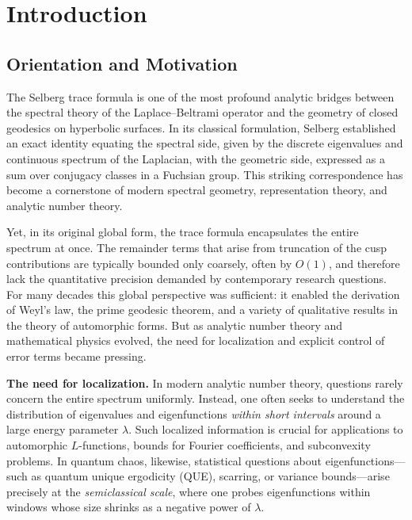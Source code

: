 
\section{Introduction}
\label{sec:introduction}

\subsection*{Orientation and Motivation}

The Selberg trace formula is one of the most profound analytic bridges between
the spectral theory of the Laplace–Beltrami operator and the geometry of closed
geodesics on hyperbolic surfaces. In its classical formulation, Selberg
\cite{Selberg1956} established an exact identity equating the spectral side,
given by the discrete eigenvalues and continuous spectrum of the Laplacian, with
the geometric side, expressed as a sum over conjugacy classes in a Fuchsian
group. This striking correspondence has become a cornerstone of modern spectral
geometry, representation theory, and analytic number theory.

Yet, in its original global form, the trace formula encapsulates the entire
spectrum at once. The remainder terms that arise from truncation of the cusp
contributions are typically bounded only coarsely, often by $O(1)$, and
therefore lack the quantitative precision demanded by contemporary research
questions. For many decades this global perspective was sufficient: it enabled
the derivation of Weyl’s law, the prime geodesic theorem, and a variety of
qualitative results in the theory of automorphic forms. But as analytic number
theory and mathematical physics evolved, the need for localization and explicit
control of error terms became pressing.

\medskip

\noindent\textbf{The need for localization.}
In modern analytic number theory, questions rarely concern the entire spectrum
uniformly. Instead, one often seeks to understand the distribution of
eigenvalues and eigenfunctions \emph{within short intervals} around a large
energy parameter $\lambda$. Such localized information is crucial for
applications to automorphic $L$-functions, bounds for Fourier coefficients, and
subconvexity problems. In quantum chaos, likewise, statistical questions about
eigenfunctions---such as quantum unique ergodicity (QUE), scarring, or
variance bounds---arise precisely at the \emph{semiclassical scale}, where one
probes eigenfunctions within windows whose size shrinks as a negative power of
$\lambda$.

